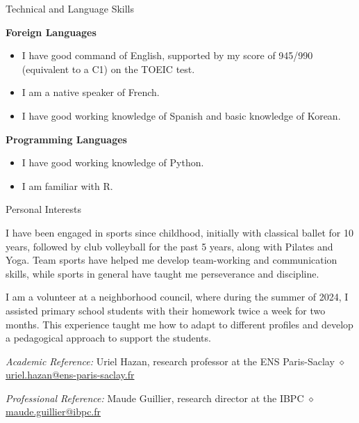 \documentclass[
	10pt,
]{style} %
\begin{document}
\begin{rSection}{Technical and Language Skills}

	\textbf{Foreign Languages}
	\begin{itemize}[noitemsep, topsep=0pt, left=0pt]
		\item I have good command of English, supported by my score of 945/990 (equivalent to a C1) on the TOEIC test.
		\item I am a native speaker of French.
		\item I have good working knowledge of Spanish and basic knowledge of Korean.
	\end{itemize}
	\textbf{Programming Languages}
	\begin{itemize}[noitemsep, topsep=0pt, left=0pt]
		\item I have good working knowledge of Python.
		\item I am familiar with R.
	\end{itemize}

\end{rSection}



\begin{rSection}{Personal Interests}
	\vspace{-1em}
	\begin{rSubsection}{}{}{}{}
		\item I have been engaged in sports since childhood, initially with classical ballet for 10 years, followed by club volleyball for the past 5 years, along with Pilates and Yoga. Team sports have helped me develop team-working and communication skills, while sports in general have taught me perseverance and discipline.
		\item I am a volunteer at a neighborhood council, where during the summer of 2024, I assisted primary school students with their homework twice a week for two months. This experience taught me how to adapt to different profiles and develop a pedagogical approach to support the students.
	\end{rSubsection}

\end{rSection}



\begin{rReferences}
	\vspace{-0.5em}
    \item \textit{Academic Reference:} Uriel Hazan, research professor at the ENS Paris-Saclay $\diamond$ \href{mailto:uriel.hazan@ens-paris-saclay.fr}{uriel.hazan@ens-paris-saclay.fr}
    \item \textit{Professional Reference:} Maude Guillier, research director at the IBPC $\diamond$ \href{mailto:maude.guillier@ibpc.fr}{maude.guillier@ibpc.fr}
\end{rReferences}
\end{document}
